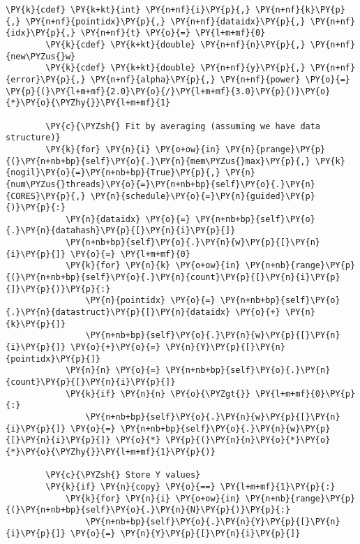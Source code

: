 \begin{Verbatim}[commandchars=\\\{\}]
        \PY{k}{cdef} \PY{k+kt}{int} \PY{n+nf}{i}\PY{p}{,} \PY{n+nf}{k}\PY{p}{,} \PY{n+nf}{pointidx}\PY{p}{,} \PY{n+nf}{dataidx}\PY{p}{,} \PY{n+nf}{idx}\PY{p}{,} \PY{n+nf}{t} \PY{o}{=} \PY{l+m+mf}{0}
        \PY{k}{cdef} \PY{k+kt}{double} \PY{n+nf}{n}\PY{p}{,} \PY{n+nf}{new\PYZus{}w}
        \PY{k}{cdef} \PY{k+kt}{double} \PY{n+nf}{y}\PY{p}{,} \PY{n+nf}{error}\PY{p}{,} \PY{n+nf}{alpha}\PY{p}{,} \PY{n+nf}{power} \PY{o}{=} \PY{p}{(}\PY{l+m+mf}{2.0}\PY{o}{/}\PY{l+m+mf}{3.0}\PY{p}{)}\PY{o}{*}\PY{o}{\PYZhy{}}\PY{l+m+mf}{1} 
        
        \PY{c}{\PYZsh{} Fit by averaging (assuming we have data structure)}
        \PY{k}{for} \PY{n}{i} \PY{o+ow}{in} \PY{n}{prange}\PY{p}{(}\PY{n+nb+bp}{self}\PY{o}{.}\PY{n}{mem\PYZus{}max}\PY{p}{,} \PY{k}{nogil}\PY{o}{=}\PY{n+nb+bp}{True}\PY{p}{,} \PY{n}{num\PYZus{}threads}\PY{o}{=}\PY{n+nb+bp}{self}\PY{o}{.}\PY{n}{CORES}\PY{p}{,} \PY{n}{schedule}\PY{o}{=}\PY{n}{guided}\PY{p}{)}\PY{p}{:}
            \PY{n}{dataidx} \PY{o}{=} \PY{n+nb+bp}{self}\PY{o}{.}\PY{n}{datahash}\PY{p}{[}\PY{n}{i}\PY{p}{]} 
            \PY{n+nb+bp}{self}\PY{o}{.}\PY{n}{w}\PY{p}{[}\PY{n}{i}\PY{p}{]} \PY{o}{=} \PY{l+m+mf}{0}
            \PY{k}{for} \PY{n}{k} \PY{o+ow}{in} \PY{n+nb}{range}\PY{p}{(}\PY{n+nb+bp}{self}\PY{o}{.}\PY{n}{count}\PY{p}{[}\PY{n}{i}\PY{p}{]}\PY{p}{)}\PY{p}{:}
                \PY{n}{pointidx} \PY{o}{=} \PY{n+nb+bp}{self}\PY{o}{.}\PY{n}{datastruct}\PY{p}{[}\PY{n}{dataidx} \PY{o}{+} \PY{n}{k}\PY{p}{]} 
                \PY{n+nb+bp}{self}\PY{o}{.}\PY{n}{w}\PY{p}{[}\PY{n}{i}\PY{p}{]} \PY{o}{+}\PY{o}{=} \PY{n}{Y}\PY{p}{[}\PY{n}{pointidx}\PY{p}{]}
            \PY{n}{n} \PY{o}{=} \PY{n+nb+bp}{self}\PY{o}{.}\PY{n}{count}\PY{p}{[}\PY{n}{i}\PY{p}{]}
            \PY{k}{if} \PY{n}{n} \PY{o}{\PYZgt{}} \PY{l+m+mf}{0}\PY{p}{:}
                \PY{n+nb+bp}{self}\PY{o}{.}\PY{n}{w}\PY{p}{[}\PY{n}{i}\PY{p}{]} \PY{o}{=} \PY{n+nb+bp}{self}\PY{o}{.}\PY{n}{w}\PY{p}{[}\PY{n}{i}\PY{p}{]} \PY{o}{*} \PY{p}{(}\PY{n}{n}\PY{o}{*}\PY{o}{*}\PY{o}{\PYZhy{}}\PY{l+m+mf}{1}\PY{p}{)}
        
        \PY{c}{\PYZsh{} Store Y values}
        \PY{k}{if} \PY{n}{copy} \PY{o}{==} \PY{l+m+mf}{1}\PY{p}{:}
            \PY{k}{for} \PY{n}{i} \PY{o+ow}{in} \PY{n+nb}{range}\PY{p}{(}\PY{n+nb+bp}{self}\PY{o}{.}\PY{n}{N}\PY{p}{)}\PY{p}{:}
                \PY{n+nb+bp}{self}\PY{o}{.}\PY{n}{Y}\PY{p}{[}\PY{n}{i}\PY{p}{]} \PY{o}{=} \PY{n}{Y}\PY{p}{[}\PY{n}{i}\PY{p}{]}
        

\end{Verbatim}
